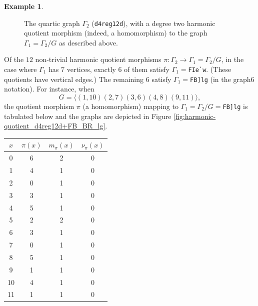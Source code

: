 \documentclass[12pt,letterpaper]{article}
\theoremstyle{definition}
\newtheorem{example}[theorem]{Example}
\begin{document}
\begin{example}
{\begin{figure}[H]
\begin{minipage}{\textwidth}
\begin{center}
%
\end{center}
\end{minipage}
\caption{The quartic graph $\Gamma_2$ ({\tt d4reg12d}), with a degree two harmonic quotient morphism (indeed, a homomorphism) to the graph $\Gamma_1=\Gamma_2/G$ as described above.}
\label{fig:harmonic-quotient_d4reg12d+G_QU_qipk}
\end{figure}

Of the $12$ non-trivial harmonic quotient morphisms
$\pi: \Gamma_2\to \Gamma_1=\Gamma_2/G$, in the case where
$\Gamma_1$ has $7$ vertices, exactly $6$ of them
satisfy $\Gamma_1=$\verb+FIe`w+. (These quotients have
vertical edges.)
The remaining $6$ satisfy $\Gamma_1=$\verb+FB]lg+
(in the graph6 notation).
For instance, when
\[
G = \langle (1,10)(2,7)(3,6)(4,8)(9,11) \rangle ,
\]
the quotient morphism $\pi$ (a homomorphism) mapping to
$\Gamma_1=\Gamma_2/G =$\verb+FB]lg+
is tabulated below
and the graphs are depicted in
Figure \ref{fig:harmonic-quotient_d4reg12d+FB_BR_lg}. 

\begin{center}
\begin{tabular}{c|c|c|c}  
  $x$ & $\pi(x)$ & $m_\pi(x)$ & $\nu_\pi(x)$   \\ \hline
  0   &    6   &        2         &  0  \\ 
  1   &    4   &        1         &  0  \\ 
  2   &    0   &        1         &  0  \\ 
  3   &    3   &        1         &  0   \\
  4   &    5   &        1         &  0   \\
  5   &    2   &        2         &  0   \\
  6   &    3   &        1         &  0   \\
  7   &    0   &        1         &  0   \\
  8   &    5   &        1         &  0   \\
  9   &    1   &        1         &  0  \\   
  10  &    4  &         1         &  0  \\
  11  &    1   &        1         &  0  \\  
\end{tabular}
\end{center}

}
\end{example}
\end{document}
